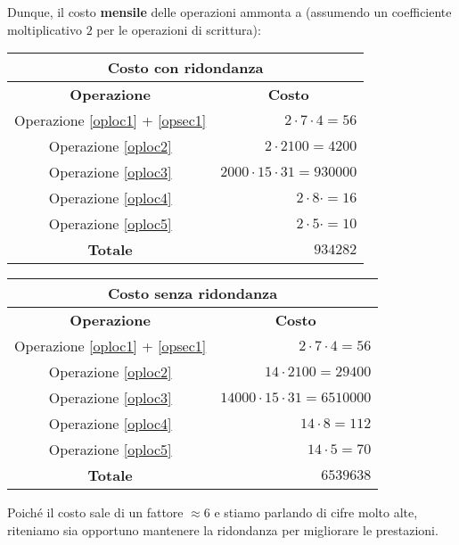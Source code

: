 \documentclass[a4paper,11pt]{article}
\begin{document}
\newline
Dunque, il costo \textbf{mensile} delle operazioni ammonta a (assumendo un
coefficiente moltiplicativo $2$ per le operazioni di scrittura):
\begin{center}
\begin{tabular}{ |c | r| }
  \hline
  \multicolumn{2}{|c|}{\textbf{Costo con ridondanza}} \\
  \hline
  \textbf{Operazione} & \multicolumn{1}{c|}{\textbf{Costo}} \\
  \hline
  Operazione \ref{oploc1} + \ref{opsec1} & $2 \cdot 7 \cdot 4 = 56$ \\
  \hline
  Operazione \ref{oploc2} & $2 \cdot 2100 = 4200$ \\
  \hline
  Operazione \ref{oploc3} & $2000 \cdot 15 \cdot 31 = 930000$ \\
  \hline
  Operazione \ref{oploc4} & $2 \cdot 8 \cdot = 16$ \\
  \hline
  Operazione \ref{oploc5} & $2 \cdot 5 \cdot = 10$ \\
  \hline
  \textbf{Totale} & $934282$ \\
  \hline
\end{tabular}
\end{center}
\begin{center}
\begin{tabular}{ |c | r| }
  \hline
  \multicolumn{2}{|c|}{\textbf{Costo senza ridondanza}} \\
  \hline
  \textbf{Operazione} & \multicolumn{1}{c|}{\textbf{Costo}} \\
  \hline
  Operazione \ref{oploc1} + \ref{opsec1} & $2 \cdot 7 \cdot 4 = 56$ \\
  \hline
  Operazione \ref{oploc2} & $14 \cdot 2100 = 29400$ \\
  \hline
  Operazione \ref{oploc3} & $14000 \cdot 15\cdot31 = 6510000$ \\
  \hline
  Operazione \ref{oploc4} & $14 \cdot 8 = 112$ \\
  \hline
  Operazione \ref{oploc5} & $14 \cdot 5 = 70$ \\
  \hline
  \textbf{Totale} & $6539638$ \\
  \hline
\end{tabular}
\end{center}

Poiché il costo sale di un fattore $\approx6$ e stiamo parlando di cifre molto alte, riteniamo sia opportuno mantenere la ridondanza per migliorare le prestazioni.
\end{document}
